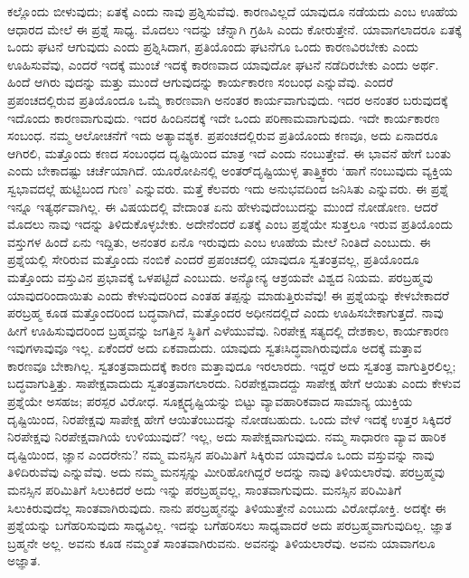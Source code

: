 ಕಲ್ಲೊಂದು ಬೀಳುವುದು; ಏತಕ್ಕೆ ಎಂದು ನಾವು ಪ್ರಶ್ನಿಸುವೆವು. ಕಾರಣವಿಲ್ಲದೆ ಯಾವುದೂ ನಡೆಯದು ಎಂಬ ಊಹೆಯ ಆಧಾರದ ಮೇಲೆ ಈ ಪ್ರಶ್ನೆ ಸಾಧ್ಯ. ಮೊದಲು ಇದನ್ನು ಚೆನ್ನಾಗಿ ಗ್ರಹಿಸಿ ಎಂದು ಕೋರುತ್ತೇನೆ. ಯಾವಾಗಲಾದರೂ ಏತಕ್ಕೆ ಒಂದು ಘಟನೆ ಆಗುವುದು ಎಂದು ಪ್ರಶ್ನಿಸಿದಾಗ, ಪ್ರತಿಯೊಂದು ಘಟನೆಗೂ ಒಂದು ಕಾರಣವಿರಬೇಕು ಎಂದು ಊಹಿಸುವೆವು, ಎಂದರೆ ಇದಕ್ಕೆ ಮುಂಚೆ ಇದಕ್ಕೆ ಕಾರಣವಾದ ಯಾವುದೋ ಘಟನೆ ನಡೆದಿರಬೇಕು ಎಂದು ಅರ್ಥ. ಹಿಂದೆ ಆಗಿರು ವುದನ್ನು ಮತ್ತು ಮುಂದೆ ಆಗುವುದನ್ನು ಕಾರ್ಯಕಾರಣ ಸಂಬಂಧ ಎನ್ನುವೆವು. ಎಂದರೆ ಪ್ರಪಂಚದಲ್ಲಿರುವ ಪ್ರತಿಯೊಂದೂ ಒಮ್ಮೆ ಕಾರಣವಾಗಿ ಅನಂತರ ಕಾರ್ಯವಾಗುವುದು. ಇದರ ಅನಂತರ ಬರುವುದಕ್ಕೆ ಇದೊಂದು ಕಾರಣವಾಗುವುದು. ಇದರ ಹಿಂದಿನದಕ್ಕೆ ಇದೇ ಒಂದು ಪರಿಣಾಮವಾಗುವುದು. ಇದೇ ಕಾರ್ಯಕಾರಣ ಸಂಬಂಧ. ನಮ್ಮ ಆಲೋಚನೆಗೆ ಇದು ಅತ್ಯಾವಶ್ಯಕ. ಪ್ರಪಂಚದಲ್ಲಿರುವ ಪ್ರತಿಯೊಂದು ಕಣವೂ, ಅದು ಏನಾದರೂ ಆಗಿರಲಿ, ಮತ್ತೊಂದು ಕಣದ ಸಂಬಂಧದ ದೃಷ್ಟಿಯಿಂದ ಮಾತ್ರ ಇದೆ ಎಂದು ನಂಬುತ್ತೇವೆ. ಈ ಭಾವನೆ ಹೇಗೆ ಬಂತು ಎಂದು ಬೇಕಾದಷ್ಟು ಚರ್ಚೆಯಾಗಿದೆ. ಯೂರೋಪಿನಲ್ಲಿ ಅಂತರ್​ದೃಷ್ಟಿಯುಳ್ಳ ತಾತ್ತ್ವಿಕರು ‘ಹಾಗೆ ನಂಬುವುದು ವ್ಯಕ್ತಿಯ ಸ್ವಭಾವದಲ್ಲೆ ಹುಟ್ಟಿಬಂದ ಗುಣ’ ಎನ್ನುವರು. ಮತ್ತೆ ಕೆಲವರು ಇದು ಅನುಭವದಿಂದ ಜನಿಸಿತು ಎನ್ನುವರು. ಈ ಪ್ರಶ್ನೆ ಇನ್ನೂ ಇತ್ಯರ್ಥವಾಗಿಲ್ಲ. ಈ ವಿಷಯದಲ್ಲಿ ವೇದಾಂತ ಏನು ಹೇಳುವುದೆಂಬುದನ್ನು ಮುಂದೆ ನೋಡೋಣ. ಆದರೆ ಮೊದಲು ನಾವು ಇದನ್ನು ತಿಳಿದುಕೊಳ್ಳಬೇಕು. ಅದೇನೆಂದರೆ ಏತಕ್ಕೆ ಎಂಬ ಪ್ರಶ್ನೆಯೇ ಸುತ್ತಲೂ ಇರುವ ಪ್ರತಿಯೊಂದು ವಸ್ತುಗಳ ಹಿಂದೆ ಏನು ಇದ್ದಿತು, ಅನಂತರ ಏನೊ ಇರುವುದು ಎಂಬ ಊಹೆಯ ಮೇಲೆ ನಿಂತಿದೆ ಎಂಬುದು. ಈ ಪ್ರಶ್ನೆಯಲ್ಲಿ ಸೇರಿರುವ ಮತ್ತೊಂದು ನಂಬಿಕೆ ಎಂದರೆ ಪ್ರಪಂಚದಲ್ಲಿ ಯಾವುದೂ ಸ್ವತಂತ್ರವಲ್ಲ, ಪ್ರತಿಯೊಂದೂ ಮತ್ತೊಂದು ವಸ್ತುವಿನ ಪ್ರಭಾವಕ್ಕೆ ಒಳಪಟ್ಟಿದೆ ಎಂಬುದು. ಅನ್ಯೋನ್ಯ ಆಶ್ರಯವೇ ವಿಶ್ವದ ನಿಯಮ. ಪರಬ್ರಹ್ಮವು ಯಾವುದರಿಂದಾಯಿತು ಎಂದು ಕೇಳುವುದರಿಂದ ಎಂತಹ ತಪ್ಪನ್ನು ಮಾಡುತ್ತಿರುವೆವು! ಈ ಪ್ರಶ್ನೆಯನ್ನು ಕೇಳಬೇಕಾದರೆ ಪರಬ್ರಹ್ಮ ಕೂಡ ಮತ್ತೊಂದರಿಂದ ಬದ್ಧವಾಗಿದೆ, ಮತ್ತೊಂದರ ಅಧೀನದಲ್ಲಿದೆ ಎಂದು ಊಹಿಸಬೇಕಾಗುತ್ತದೆ. ನಾವು ಹೀಗೆ ಊಹಿಸುವುದರಿಂದ ಬ್ರಹ್ಮವನ್ನು ಜಗತ್ತಿನ ಸ್ಥಿತಿಗೆ ಎಳೆಯುವೆವು. ನಿರಪೇಕ್ಷ ಸತ್ಯದಲ್ಲಿ ದೇಶಕಾಲ, ಕಾರ್ಯಕಾರಣ ಇವುಗಳಾವುವೂ ಇಲ್ಲ. ಏಕೆಂದರೆ ಅದು ಏಕವಾದುದು. ಯಾವುದು ಸ್ವತಃಸಿದ್ಧವಾಗಿರುವುದೊ ಅದಕ್ಕೆ ಮತ್ತಾವ ಕಾರಣವೂ ಬೇಕಾಗಿಲ್ಲ. ಸ್ವತಂತ್ರವಾದುದಕ್ಕೆ ಕಾರಣ ಮತ್ತಾವುದೂ ಇರಲಾರದು. ಇದ್ದರೆ ಅದು ಸ್ವತಂತ್ರ ವಾಗುತ್ತಿರಲಿಲ್ಲ; ಬದ್ಧವಾಗುತ್ತಿತ್ತು. ಸಾಪೇಕ್ಷವಾದುದು ಸ್ವತಂತ್ರವಾಗಲಾರದು. ನಿರಪೇಕ್ಷವಾದದ್ದು ಸಾಪೇಕ್ಷ ಹೇಗೆ ಆಯಿತು ಎಂದು ಕೇಳುವ ಪ್ರಶ್ನೆಯೇ ಅಸಹಜ; ಪರಸ್ಪರ ವಿರೋಧ. ಸೂಕ್ಷ್ಮದೃಷ್ಟಿಯನ್ನು ಬಿಟ್ಟು ವ್ಯಾವಹಾರಿಕವಾದ ಸಾಮಾನ್ಯ ಯುಕ್ತಿಯ ದೃಷ್ಟಿಯಿಂದ, ನಿರಪೇಕ್ಷವು ಸಾಪೇಕ್ಷ ಹೇಗೆ ಆಯಿತೆಂಬುದನ್ನು ನೋಡಬಹುದು. ಒಂದು ವೇಳೆ ಇದಕ್ಕೆ ಉತ್ತರ ಸಿಕ್ಕಿದರೆ ನಿರಪೇಕ್ಷವು ನಿರಪೇಕ್ಷವಾಗಿಯೆ ಉಳಿಯುವುದೆ? ಇಲ್ಲ, ಅದು ಸಾಪೇಕ್ಷವಾಗುವುದು. ನಮ್ಮ ಸಾಧಾರಣ ವ್ಯಾವ ಹಾರಿಕ ದೃಷ್ಟಿಯಿಂದ, ಜ್ಞಾನ ಎಂದರೇನು? ನಮ್ಮ ಮನಸ್ಸಿನ ಪರಿಮಿತಿಗೆ ಸಿಕ್ಕಿರುವ ಯಾವುದೊ ಒಂದು ವಸ್ತುವನ್ನು ನಾವು ತಿಳಿದಿರುವೆವು ಎನ್ನುವೆವು. ಅದು ನಮ್ಮ ಮನಸ್ಸನ್ನು ಮೀರಿಹೋಗಿದ್ದರೆ ಅದನ್ನು ನಾವು ತಿಳಿಯಲಾರೆವು. ಪರಬ್ರಹ್ಮವು ಮನಸ್ಸಿನ ಪರಿಮಿತಿಗೆ ಸಿಲುಕಿದರೆ ಅದು ಇನ್ನು ಪರಬ್ರಹ್ಮವಲ್ಲ, ಸಾಂತವಾಗುವುದು. ಮನಸ್ಸಿನ ಪರಿಮಿತಿಗೆ ಸಿಲುಕಿರುವುದೆಲ್ಲ ಸಾಂತವಾಗಿರುವುದು. ನಾನು ಪರಬ್ರಹ್ಮನನ್ನು ತಿಳಿಯುತ್ತೇನೆ ಎಂಬುದು ವಿರೋಧೋಕ್ತಿ. ಅದಕ್ಕೇ ಈ ಪ್ರಶ್ನೆಯನ್ನು ಬಗೆಹರಿಸುವುದು ಸಾಧ್ಯವಿಲ್ಲ. ಇದನ್ನು ಬಗೆಹರಿಸಲು ಸಾಧ್ಯವಾದರೆ ಅದು ಪರಬ್ರಹ್ಮವಾಗುವುದಿಲ್ಲ. ಜ್ಞಾತ ಬ್ರಹ್ಮನೇ ಅಲ್ಲ. ಅವನು ಕೂಡ ನಮ್ಮಂತೆ ಸಾಂತವಾಗಿರುವನು. ಅವನನ್ನು ತಿಳಿಯಲಾರೆವು. ಅವನು ಯಾವಾಗಲೂ ಅಜ್ಞಾತ.

